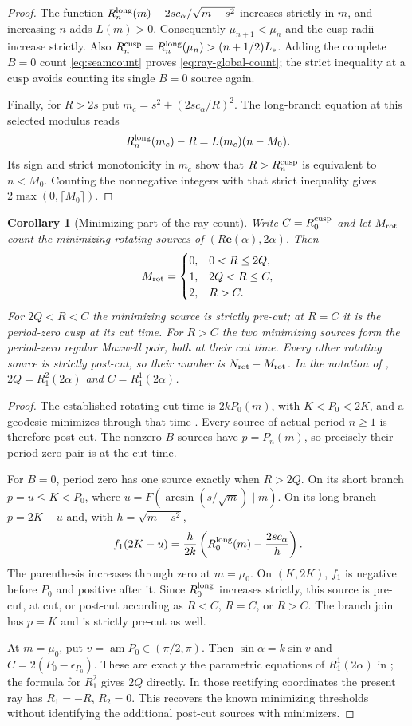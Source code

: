 \documentclass[11pt,a4paper]{article}
\newtheorem{corollary}[theorem]{Corollary}
\theoremstyle{remark}\newtheorem{remark}[theorem]{Remark}
\newcommand{\ee}{\mathbf e}
\begin{document}
\begin{proof}
The function $R_n^{\rm long}(m)-2sc_\alpha/\sqrt{m-s^2}$
increases strictly in $m$, and increasing $n$ adds $L(m)>0$.
Consequently $\mu_{n+1}<\mu_n$ and the cusp radii increase strictly.
Also $R_n^{\rm cusp}=R_n^{\rm long}(\mu_n)>(n+1/2)L_*$.
Adding the complete $B=0$ count \eqref{eq:seamcount} proves
\eqref{eq:ray-global-count}; the strict inequality at a cusp avoids
counting its single $B=0$ source again.

Finally, for $R>2s$ put $m_c=s^2+(2sc_\alpha/R)^2$.
The long-branch equation at this selected modulus reads
\[
 R_n^{\rm long}(m_c)-R=L(m_c)(n-M_0).
\]
Its sign and strict monotonicity in $m_c$ show that
$R>R_n^{\rm cusp}$ is equivalent to $n<M_0$.
Counting the nonnegative integers with that strict inequality gives
$2\max(0,\lceil M_0\rceil)$.
\end{proof}

\begin{corollary}[Minimizing part of the ray count]\label{cor:ray-cut-status}
Write $C=R_0^{\rm cusp}$ and let $M_{\rm rot}$ count the minimizing
rotating sources of $(R\ee(\alpha),2\alpha)$. Then
\[
 M_{\rm rot}=
 \begin{cases}
 0,&0<R\le2Q,\\
 1,&2Q<R\le C,\\
 2,&R>C.
 \end{cases}
\]
For $2Q<R<C$ the minimizing source is strictly pre-cut; at $R=C$
it is the period-zero cusp at its cut time. For $R>C$ the two
minimizing sources form the period-zero regular Maxwell pair, both
at their cut time. Every other rotating source is strictly post-cut,
so their number is $N_{\rm rot}-M_{\rm rot}$.
In the notation of \cite[(2.13), (2.20)]{SS},
$2Q=R_1^2(2\alpha)$ and $C=R_1^1(2\alpha)$.
\end{corollary}
\begin{proof}
The established rotating cut time is $2kP_0(m)$, with
$K<P_0<2K$, and a geodesic minimizes through that time
\cite[(2.2), Theorem 3.3]{SS}. Every source of actual period
$n\ge1$ is therefore post-cut. The nonzero-$B$ sources have
$p=P_n(m)$, so precisely their period-zero pair is at the cut time.

For $B=0$, period zero has one source exactly when $R>2Q$.
On its short branch $p=u\le K<P_0$, where
$u=F(\arcsin(s/\sqrt m)\mid m)$. On its long branch
$p=2K-u$ and, with $h=\sqrt{m-s^2}$,
\[
 f_1(2K-u)=\frac{h}{2k}
 \left(R_0^{\rm long}(m)-\frac{2sc_\alpha}{h}\right).
\]
The parenthesis increases through zero at $m=\mu_0$.
On $(K,2K)$, $f_1$ is negative before $P_0$ and positive after it.
Since $R_0^{\rm long}$ increases strictly, this source is pre-cut,
at cut, or post-cut according as $R<C$, $R=C$, or $R>C$.
The branch join has $p=K$ and is strictly pre-cut as well.

At $m=\mu_0$, put $v=\operatorname{am}P_0\in(\pi/2,\pi)$.
Then $\sin\alpha=k\sin v$ and
$C=2(P_0-\epsilon_{P_0})$. These are exactly the parametric
equations of $R_1^1(2\alpha)$ in \cite[(2.18)--(2.20)]{SS};
the formula for $R_1^2$ gives $2Q$ directly. In those rectifying
coordinates the present ray has $R_1=-R$, $R_2=0$.
This recovers the known minimizing thresholds without identifying
the additional post-cut sources with minimizers.
\end{proof}
\end{document}
